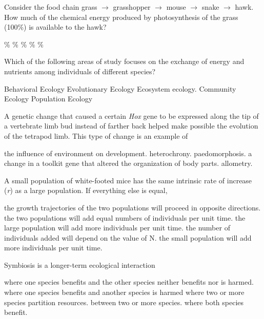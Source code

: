 
\question
Consider the food chain grass $\to$ grasshopper $\to$ mouse $\to$ snake $\to$ hawk. How much of the chemical energy produced by photosynthesis of the grass (100\%) is available to the hawk?

\begin{choices}
\%
\%
\%
\%
\%
\end{choices}

\question
Which of the following areas of study focuses on the exchange of energy and nutrients among individuals of different species?

\begin{choices}
\choice Behavioral Ecology 
\choice Evolutionary Ecology 
\correctchoice Ecosystem ecology. 
\choice Community Ecology 
\choice Population Ecology 
\end{choices}

\newpage

\question
A genetic change that caused a certain \textit{Hox} gene to be expressed along the tip of a vertebrate limb bud instead of farther back helped make possible the  evolution of the tetrapod limb. This type of change is an example of 
\begin{choices}
\choice the influence of environment on development.
\choice heterochrony.
\choice paedomorphosis.
\correctchoice a change in a toolkit gene that altered the organization of body parts.
\choice allometry.
\end{choices}

\question
A small population of white-footed mice has the same intrinsic rate of increase (\textit{r}) as a large population.  If everything else is equal, 

\begin{choices}
\choice the growth trajectories of the two populations will proceed in opposite directions. 
\choice the two populations will add equal numbers of individuals per unit time.
\correctchoice the large population will add more individuals per unit time.  
\choice the number of individuals added will depend on the value of N. 
\choice the small population will add more individuals per unit time. 
\end{choices}

\question
Symbiosis is a longer-term ecological interaction

\begin{choices}
\choice  where one species benefits and the other species neither benefits nor is harmed. 
\choice where one species benefits and another species is harmed 
\choice where two or more species partition resources. 
\correctchoice between two or more species. 
\choice where both species benefit. 
\end{choices}

